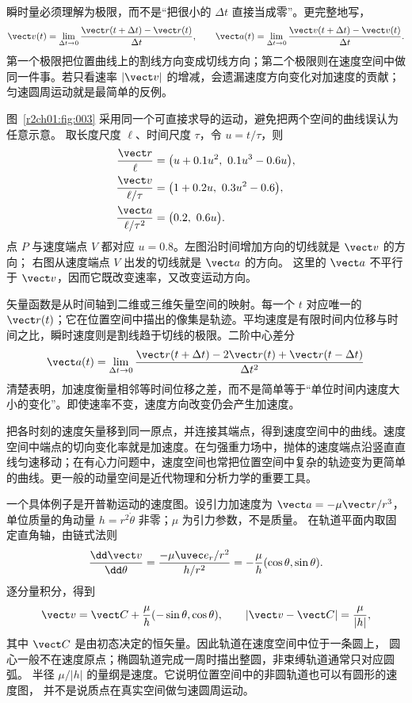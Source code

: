 瞬时量必须理解为极限，而不是“把很小的 $\Delta t$ 直接当成零”。更完整地写，
\[
  \vect v(t)=\lim_{\Delta t\to0}
  \frac{\vect r(t+\Delta t)-\vect r(t)}{\Delta t},
  \qquad
  \vect a(t)=\lim_{\Delta t\to0}
  \frac{\vect v(t+\Delta t)-\vect v(t)}{\Delta t}.
\]
第一个极限把位置曲线上的割线方向变成切线方向；第二个极限则在速度空间中做同一件事。若只看速率 $|\vect v|$ 的增减，会遗漏速度方向变化对加速度的贡献；匀速圆周运动就是最简单的反例。

\figKinematicVectors

图~\ref{r2ch01:fig:003} 采用同一个可直接求导的运动，避免把两个空间的曲线误认为任意示意。
取长度尺度 $\ell$、时间尺度 $\tau$，令 $u=t/\tau$，则
\[
 \begin{aligned}
 \frac{\vect r}{\ell}&=\bigl(u+0.1u^2,\ 0.1u^3-0.6u\bigr),\\
 \frac{\vect v}{\ell/\tau}&=\bigl(1+0.2u,\ 0.3u^2-0.6\bigr),\\
 \frac{\vect a}{\ell/\tau^2}&=\bigl(0.2,\ 0.6u\bigr).
 \end{aligned}
\]
点 $P$ 与速度端点 $V$ 都对应 $u=0.8$。左图沿时间增加方向的切线就是 $\vect v$ 的方向；
右图从速度端点 $V$ 出发的切线就是 $\vect a$ 的方向。
这里的 $\vect a$ 不平行于 $\vect v$，因而它既改变速率，又改变运动方向。

矢量函数是从时间轴到二维或三维矢量空间的映射。每一个 $t$ 对应唯一的 $\vect r(t)$；它在位置空间中描出的像集是轨迹。平均速度是有限时间内位移与时间之比，瞬时速度则是割线趋于切线的极限。二阶中心差分
\[
  \vect a(t)=\lim_{\Delta t\to0}
  \frac{\vect r(t+\Delta t)-2\vect r(t)+\vect r(t-\Delta t)}{\Delta t^2}
\]
清楚表明，加速度衡量相邻等时间位移之差，而不是简单等于“单位时间内速度大小的变化”。即使速率不变，速度方向改变仍会产生加速度。

把各时刻的速度矢量移到同一原点，并连接其端点，得到速度空间中的曲线。速度空间中端点的切向变化率就是加速度。在匀强重力场中，抛体的速度端点沿竖直直线匀速移动；在有心力问题中，速度空间也常把位置空间中复杂的轨迹变为更简单的曲线。更一般的动量空间是近代物理和分析力学的重要工具。

一个具体例子是开普勒运动的速度图。设引力加速度为 $\vect a=-\mu\vect r/r^3$，
单位质量的角动量 $h=r^2\dot\theta$ 非零；$\mu$ 为引力参数，不是质量。
在轨道平面内取固定直角轴，由链式法则
\[
 \frac{\dd\vect v}{\dd\theta}
 =\frac{-\mu\uvec e_r/r^2}{h/r^2}
 =-\frac{\mu}{h}(\cos\theta,\sin\theta).
\]
逐分量积分，得到
\[
 \vect v=\vect C+\frac{\mu}{h}(-\sin\theta,\cos\theta),\qquad
 |\vect v-\vect C|=\frac{\mu}{|h|},
\]
其中 $\vect C$ 是由初态决定的恒矢量。因此轨道在速度空间中位于一条圆上，
圆心一般不在速度原点；椭圆轨道完成一周时描出整圆，非束缚轨道通常只对应圆弧。
半径 $\mu/|h|$ 的量纲是速度。它说明位置空间中的非圆轨道也可以有圆形的速度图，
并不是说质点在真实空间做匀速圆周运动。


